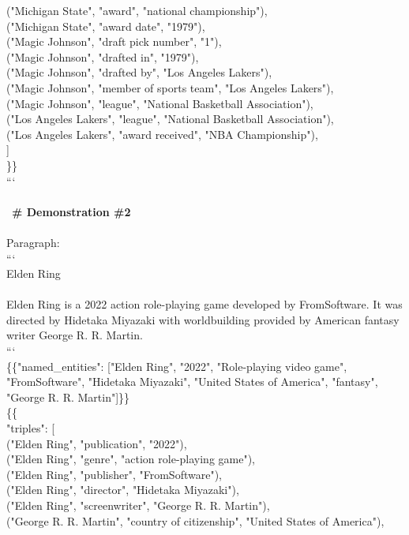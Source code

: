 \begin{prompt}[title={Reader}]
        ("Michigan State", "award", "national championship"), \\
        ("Michigan State", "award date", "1979"), \\
        ("Magic Johnson", "draft pick number", "1"), \\
        ("Magic Johnson", "drafted in", "1979"), \\
        ("Magic Johnson", "drafted by", "Los Angeles Lakers"), \\
        ("Magic Johnson", "member of sports team", "Los Angeles Lakers"), \\
        ("Magic Johnson", "league", "National Basketball Association"), \\
        ("Los Angeles Lakers", "league", "National Basketball Association"), \\
        ("Los Angeles Lakers", "award received", "NBA Championship"), \\
    ] \\
\}\} \\
``` \\
\\
\ \textbf{\# Demonstration \#2} \\
\\
Paragraph: \\
``` \\
Elden Ring \\
\\
Elden Ring is a 2022 action role-playing game developed by FromSoftware. It was directed by Hidetaka Miyazaki with worldbuilding provided by American fantasy writer George R. R. Martin. \\
``` \\
\{\{"named\_entities": ["Elden Ring", "2022", "Role-playing video game", "FromSoftware", "Hidetaka Miyazaki", "United States of America", "fantasy", "George R. R. Martin"]\}\} \\
\{\{ \\
    "triples": [ \\
        ("Elden Ring", "publication", "2022"), \\
        ("Elden Ring", "genre", "action role-playing game"), \\
        ("Elden Ring", "publisher", "FromSoftware"), \\
        ("Elden Ring", "director", "Hidetaka Miyazaki"), \\
        ("Elden Ring", "screenwriter", "George R. R. Martin"), \\
        ("George R. R. Martin", "country of citizenship", "United States of America"), \\

\end{prompt}
